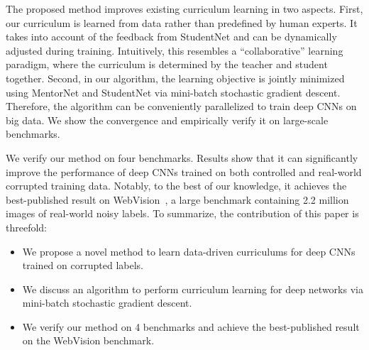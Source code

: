 \documentclass{article}
\begin{document}
The proposed method improves existing curriculum learning in two aspects. First, our curriculum is learned from data rather than predefined by human experts. It takes into account of the feedback from StudentNet and can be dynamically adjusted during training. Intuitively, this resembles a ``collaborative'' learning paradigm, where the curriculum is determined by the teacher and student together. Second, in our algorithm, the learning objective is jointly minimized using MentorNet and StudentNet via mini-batch stochastic gradient descent. Therefore, the algorithm can be conveniently parallelized to train deep CNNs on big data. We show the convergence and empirically verify it on large-scale benchmarks.

We verify our method on four benchmarks. Results show that it can significantly improve the performance of deep CNNs trained on both controlled and real-world corrupted training data. Notably, to the best of our knowledge, it achieves the best-published result on WebVision~\cite{li2017webvision}, a large benchmark containing 2.2 million images of real-world noisy labels. To summarize, the contribution of this paper is threefold:

\begin{itemize}
\vspace{-3mm}
    \item We propose a novel method to learn data-driven curriculums for deep CNNs trained on corrupted labels.
\vspace{-5mm}
    \item We discuss an algorithm to perform curriculum learning for deep networks via mini-batch stochastic gradient descent.
\vspace{-2mm}
    \item We verify our method on 4 benchmarks and achieve the best-published result on the WebVision benchmark.
\vspace{-5mm}
\end{itemize}

\vspace{-5mm}
\end{document}
